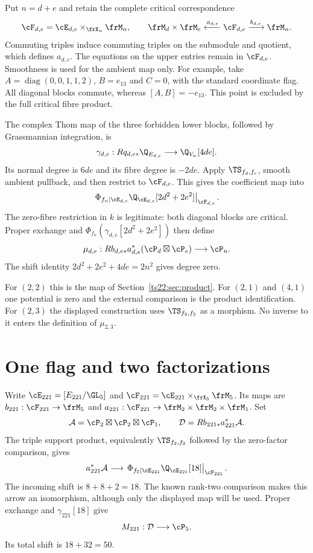 Put $n=d+e$ and retain the complete critical correspondence
\[
 \cF_{d,e}=\cE_{d,e}\times_{\frX_n}\frM_n,
 \qquad
 \frM_d\times\frM_e\xleftarrow{a_{d,e}}\cF_{d,e}
                       \xrightarrow{b_{d,e}}\frM_n.
\]
Commuting triples induce commuting triples on the submodule and
quotient, which defines $a_{d,e}$. The equations on the upper
entries remain in $\cF_{d,e}$. Smoothness is used for the ambient
map only. For example, take $A=\operatorname{diag}(0,0,1,1,2)$,
$B=e_{13}$ and $C=0$, with the standard coordinate flag.
All diagonal blocks commute, whereas $[A,B]=-e_{13}$.
This point is excluded by the full critical fibre product.

The complex Thom map of the three forbidden lower blocks, followed
by Grassmannian integration, is
\[
 \gamma_{d,e}:Rq_{d,e*}\Q_{E_{d,e}}\longrightarrow\Q_{V_n}[4de].
\]
Its normal degree is $6de$ and its fibre degree is $-2de$.
Apply $\TS_{f_d,f_e}$, smooth ambient pullback, and then restrict to
$\cF_{d,e}$. This gives the coefficient map into
\[
 \left.\Phi_{f_n|\cE_{d,e}}
       \Q_{\cE_{d,e}}[2d^2+2e^2]\right|_{\cF_{d,e}}.
\]
The zero-fibre restriction in $k$ is legitimate: both diagonal blocks
are critical. Proper exchange and
$\Phi_{f_n}(\gamma_{d,e}[2d^2+2e^2])$ then define
\[
 \mu_{d,e}:Rb_{d,e*}a_{d,e}^*(\cP_d\boxtimes\cP_e)
                             \longrightarrow\cP_n.
\]
The shift identity $2d^2+2e^2+4de=2n^2$ gives degree zero.

For $(2,2)$ this is the map of Section~\ref{ts22:sec:product}.
For $(2,1)$ and $(4,1)$ one potential is zero and the external
comparison is the product identification. For $(2,3)$ the displayed
construction uses $\TS_{f_2,f_3}$ as a morphism. No inverse to it
enters the definition of $\mu_{2,3}$.

\section{One flag and two factorizations}
\label{fl221:sec:flag}

Write $\cE_{221}=[E_{221}/\GL_5]$ and
$\cF_{221}=\cE_{221}\times_{\frX_5}\frM_5$.
Its maps are $b_{221}:\cF_{221}\to\frM_5$ and
$a_{221}:\cF_{221}\to\frM_2\times\frM_2\times\frM_1$.
Set
\[
 \mathcal A=\cP_2\boxtimes\cP_2\boxtimes\cP_1,\qquad
 \mathcal D=Rb_{221*}a_{221}^*\mathcal A.
\]
The triple support product, equivalently
$\TS_{f_2,f_2}$ followed by the zero-factor comparison, gives
\[
 a_{221}^*\mathcal A\longrightarrow
 \left.\Phi_{f_5|\cE_{221}}\Q_{\cE_{221}}[18]
                                             \right|_{\cF_{221}}.
\]
The incoming shift is $8+8+2=18$. The known rank-two comparison
makes this arrow an isomorphism, although only the displayed map
will be used. Proper exchange and $\gamma_{221}[18]$ give
\[
                      M_{221}:\mathcal D\longrightarrow\cP_5.
\]
Its total shift is $18+32=50$.

